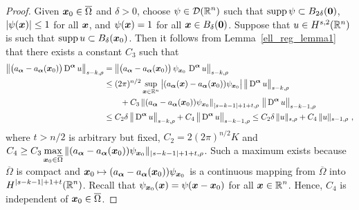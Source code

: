 \begin{proof}
Given ${\bm{x}}_0 \in \overline{\Omega}$ and $\delta >0$,
choose $\displaystyle \psi \in \mathcal{D}(\mathbb{R}^n)$ such that
$\operatorname{supp} \psi \subset B_{2\delta}({\bm{0}})$, $|\psi({\bm{x}})|\leq 1$ for
all ${\bm{x}}$, and $\psi({\bm{x}}) = 1$ for all ${\bm{x}} \in B_\delta({\bm{0}})$.
Suppose that $u \in H^{s,2}(\mathbb{R}^n)$ is such that
$\displaystyle \operatorname{supp} u \subset B_\delta({\bm{x}}_0)$.
Then it follows
from Lemma~\ref{ell_reg_lemma1} that there exists a constant $C_3$ such that
\begin{align*}
\left\| \big(a_{{\bm{\alpha}}} - a_{{\bm{\alpha}}}({\bm{x}}_0)\big)
\operatorname{D}^{{\bm{\alpha}}} u \right\|_{s-k,\rho}
&= \left\| \big(a_{{\bm{\alpha}}} - a_{{\bm{\alpha}}}({\bm{x}}_0)\big)
\,\psi_{{\bm{x}}_0}\, \operatorname{D}^{{\bm{\alpha}}} u \right\|_{s-k,\rho} \\
&\leq (2\pi)^{n/2}
\sup_{{\bm{x}} \in \mathbb{R}^n} \big| (a_{{\bm{\alpha}}}({\bm{x}}) -
a_{{\bm{\alpha}}}({\bm{x}}_0)) \psi_{{\bm{x}}_0} \big|\,
\big\|\operatorname{D}^{{\bm{\alpha}}}  u\big\|_{s-k,\rho} \\
&\qquad
+ C_3 \left\|(a_{{\bm{\alpha}}} - a_{{\bm{\alpha}}}({\bm{x}}_0))
\psi_{{\bm{x}}_0}\right\|_{|s-k-1|+1+t,\rho}
\, \big\|\operatorname{D}^{{\bm{\alpha}}} u \big\|_{s-k-1,\rho} \\
&\leq C_2 \delta \, \big\|\operatorname{D}^{{\bm{\alpha}}} u\big\|_{s-k,\rho}
+ C_4 \, \big\|\operatorname{D}^{{\bm{\alpha}}} u \big\|_{s-k-1,\rho} 
\leq C_2 \delta \, \|u\|_{s,\rho}
+ C_4 \, \|u \|_{s-1,\rho}  \ ,
\end{align*}
where $t > n/2$ is arbitrary but fixed,
$\displaystyle C_2 = 2 (2\pi)^{n/2}K$ and \\
$\displaystyle C_4 \geq C_3 \max_{{\bm{x}}_0 \in \overline{\Omega}}
\|(a_{{\bm{\alpha}}} - a_{{\bm{\alpha}}}({\bm{x}}_0))
\psi_{{\bm{x}}_0}\|_{|s-k-1|+1+t,\rho}$.
Such a maximum exists because $\overline{\Omega}$ is compact
and ${\bm{x}}_0 \mapsto (a_{{\bm{\alpha}}} -
a_{{\bm{\alpha}}}({\bm{x}}_0))\psi_{{\bm{x}}_0}$
is a continuous mapping from $\overline{\Omega}$ into
$\displaystyle H^{|s-k-1|+1+t}(\mathbb{R}^n)$.  Recall that
$\psi_{{\bm{x}}_0}({\bm{x}}) = \psi({\bm{x}} - {\bm{x}}_0)$ for all
$\displaystyle {\bm{x}} \in \mathbb{R}^n$.
Hence, $C_4$ is independent of ${\bm{x}}_0 \in \overline{\Omega}$.


\end{proof}
